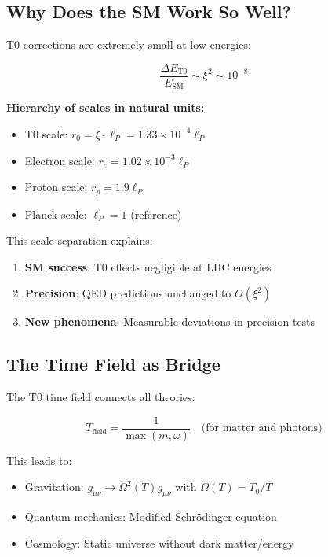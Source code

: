 \documentclass[12pt,a4paper]{article}
\begin{document}
	\subsection{Why Does the SM Work So Well?}
	
	T0 corrections are extremely small at low energies:
	
	\begin{equation}
		\frac{\Delta E_{\text{T0}}}{E_{\text{SM}}} \sim \xi^2 \sim 10^{-8}
	\end{equation}
	
	\textbf{Hierarchy of scales in natural units:}
	\begin{itemize}
		\item T0 scale: $r_0 = \xi \cdot \ell_P = 1.33 \times 10^{-4} \ell_P$
		\item Electron scale: $r_e = 1.02 \times 10^{-3} \ell_P$
		\item Proton scale: $r_p = 1.9 \ell_P$
		\item Planck scale: $\ell_P = 1$ (reference)
	\end{itemize}
	
	This scale separation explains:
	\begin{enumerate}
		\item \textbf{SM success}: T0 effects negligible at LHC energies
		\item \textbf{Precision}: QED predictions unchanged to $O(\xi^2)$
		\item \textbf{New phenomena}: Measurable deviations in precision tests
	\end{enumerate}
	
	\subsection{The Time Field as Bridge}
	
	The T0 time field connects all theories:
	
	\begin{equation}
		T_{\text{field}} = \frac{1}{\max(m, \omega)} \quad \text{(for matter and photons)}
	\end{equation}
	
	This leads to:
	\begin{itemize}
		\item Gravitation: $g_{\mu\nu} \to \Omega^2(T) g_{\mu\nu}$ with $\Omega(T) = T_0/T$
		\item Quantum mechanics: Modified Schrödinger equation
		\item Cosmology: Static universe without dark matter/energy
	\end{itemize}
	
\end{document}

